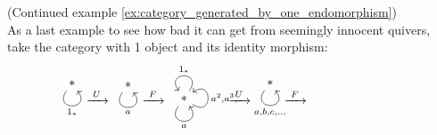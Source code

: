 \begin{example}{(Continued example \ref{ex:category_generated_by_one_endomorphism})}\\

As a last example to see how bad it can get from seemingly innocent quivers, take the category with 1 object and its identity morphism:
\[
\noindent\begin{minipage}{.005\textwidth}
\phantom{}
\end{minipage}
\begin{minipage}{.08\textwidth}
\begin{tikzcd}
\ast \arrow["1_{\ast}"', loop, distance=2em, in=305, out=235]
\end{tikzcd}
\end{minipage}
%
\begin{minipage}{.05\textwidth}
$\xrightarrow{\text{     }U\text{     }}$
\end{minipage}
%
\begin{minipage}{.08\textwidth}
\begin{tikzcd}
\ast \arrow["a"', loop, distance=2em, in=305, out=235]
\end{tikzcd}
\end{minipage}
%
\begin{minipage}{.05\textwidth}
$\xrightarrow{\text{     }F\text{     }}$
\end{minipage}
%
\begin{minipage}{.15\textwidth}
\begin{tikzcd}
\ast \arrow["a"', loop, distance=2em, in=305, out=235] \arrow["1_{\ast}"', loop, distance=2em, in=125, out=55] \arrow["{a^{2}, a^{3},\dots}"', loop, distance=2em, in=35, out=325]
\end{tikzcd}
\end{minipage}
%
\begin{minipage}{.05\textwidth}
$\xrightarrow{\text{     }U\text{     }}$
\end{minipage}
%
\begin{minipage}{.08\textwidth}
\begin{tikzcd}
\ast \arrow["{a, b, c,\dots}"', loop, distance=2em, in=305, out=235]
\end{tikzcd}
\end{minipage}
%
\begin{minipage}{.05\textwidth}
$\xrightarrow{\text{     }F\text{     }}$
\end{minipage}
%
\begin{minipage}{.25\textwidth}
\begin{tikzcd}

\end{tikzcd}
\end{minipage}\]
\end{example}
